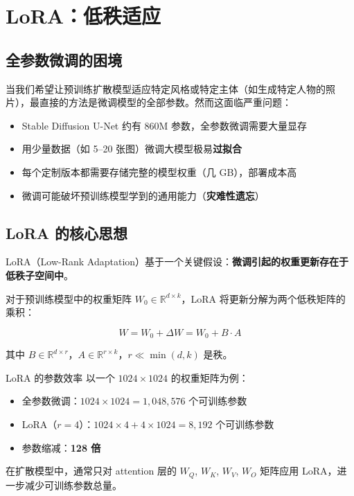\section{LoRA：低秩适应}

\subsection{全参数微调的困境}

当我们希望让预训练扩散模型适应特定风格或特定主体（如生成特定人物的照片），最直接的方法是微调模型的全部参数。然而这面临严重问题：

\begin{itemize}
    \item Stable Diffusion U-Net 约有 860M 参数，全参数微调需要大量显存
    \item 用少量数据（如 5--20 张图）微调大模型极易\textbf{过拟合}
    \item 每个定制版本都需要存储完整的模型权重（几 GB），部署成本高
    \item 微调可能破坏预训练模型学到的通用能力（\textbf{灾难性遗忘}）
\end{itemize}

\subsection{LoRA 的核心思想}

LoRA（Low-Rank Adaptation）基于一个关键假设：\textbf{微调引起的权重更新存在于低秩子空间中}。

对于预训练模型中的权重矩阵 $W_0 \in \mathbb{R}^{d \times k}$，LoRA 将更新分解为两个低秩矩阵的乘积：

$$
W = W_0 + \Delta W = W_0 + B \cdot A
$$

其中 $B \in \mathbb{R}^{d \times r}$，$A \in \mathbb{R}^{r \times k}$，$r \ll \min(d, k)$ 是秩。

\begin{importantbox}{LoRA 的参数效率}
以一个 $1024 \times 1024$ 的权重矩阵为例：
\begin{itemize}
    \item 全参数微调：$1024 \times 1024 = 1,048,576$ 个可训练参数
    \item LoRA（$r=4$）：$1024 \times 4 + 4 \times 1024 = 8,192$ 个可训练参数
    \item 参数缩减：\textbf{128 倍}
\end{itemize}
在扩散模型中，通常只对 attention 层的 $W_Q$, $W_K$, $W_V$, $W_O$ 矩阵应用 LoRA，进一步减少可训练参数总量。
\end{importantbox}

